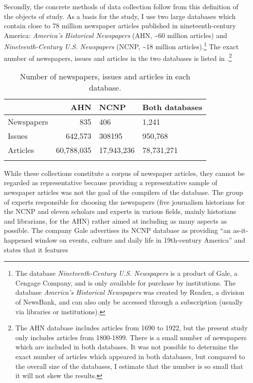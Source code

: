 Secondly, the concrete methods of data collection follow from this definition of the objects of study. As a basis for the study, I use two large databases which contain close to 78 million newspaper articles published in nineteenth-century America: \emph{America’s Historical Newspapers} (AHN, {\textasciitilde}60 million articles) and \emph{Nineteenth-Century U.S. Newspapers} (NCNP, {\textasciitilde}18 million articles).\footnote{The database \textit{Nineteenth-Century U.S. Newspapers} is a product of Gale, a Cengage Company, and is only available for purchase by institutions. The database \textit{America's Historical Newspapers} was created by Readex, a division of NewsBank, and can also only be accessed through a subscription (usually via libraries or institutions).} The exact number of newspapers, issues and articles in the two databases is listed in .\footnote{The AHN database includes articles from 1690 to 1922, but the present study only includes articles from 1800-1899. There is a small number of newspapers which are included in both databases. It was not possible to determine the exact number of articles which appeared in both databases, but compared to the overall size of the databases, I estimate that the number is so small that it will not skew the results.}


\begin{table}
\begin{tabularx}{\textwidth}{XrYY}
\lsptoprule
& AHN & NCNP  & Both databases\\
\midrule
Newspapers &  835 &  406 &  1,241\\
Issues &  642,573 &  308195 &  950,768\\
Articles &  60,788,035 &  17,943,236 &  78,731,271\\
\lspbottomrule
\end{tabularx}
\caption{Number of newspapers, issues and articles in each database.
}
\label{tab:key:8}
\end{table}

While these collections constitute a corpus of newspaper articles, they cannot be regarded as representative because providing a representative sample of newspaper articles was not the goal of the compilers of the database. The group of experts responsible for choosing the newspapers (five journalism historians for the NCNP and eleven scholars and experts in various fields, mainly historians and librarians, for the AHN) rather aimed at including as many aspects as possible. The company Gale advertises its NCNP database as providing “an as-it-happened window on events, culture and daily life in 19th-century America” and states that it features


